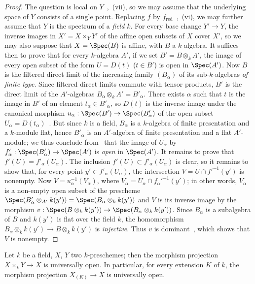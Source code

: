 \begin{proof}
The question is local on $Y$~,~(vii), so we may assume that the underlying space of $Y$ consists of a single point. Replacing $f$ by $f_{\mathrm{red}}$~,~(vi), we may further assume that $Y$ is the spectrum of a \emph{field} $k$. For every base change $Y'\to Y$, the inverse images in $X'=X\times_Y Y'$ of the affine open subsets of $X$ cover $X'$, so we may also suppose that $X=\Spec(B)$ is affine, with $B$ a $k$-algebra.
It suffices then to prove that for every $k$-algebra $A'$, if we set $B'=B\otimes_k A'$, the image of every open subset of the form $U=D(t)$ ($t\in B'$) is open in $\Spec(A')$.
Now $B$ is the filtered direct limit of the increasing family $(B_\alpha)$ of its sub-$k$-algebras \emph{of finite type}. Since filtered direct limits commute with tensor products, $B'$ is the direct limit of the $A'$-algebras $B_\alpha\otimes_k A'=B'_\alpha$.
There exists $\alpha$ such that $t$ is the image in $B'$ of an element $t_\alpha\in B'_\alpha$, so $D(t)$ is the inverse image under the canonical morphism $u_\alpha:\Spec(B')\to\Spec(B'_\alpha)$ of the open subset $U_\alpha=D(t_\alpha)$~.
But since $k$ is a field, $B_\alpha$ is a $k$-algebra of finite presentation and a $k$-module flat, hence $B'_\alpha$ is an $A'$-algebra of finite presentation and a flat $A'$-module; we thus conclude from~ that the image of $U_\alpha$ by $f'_\alpha:\Spec(B'_\alpha)\to\Spec(A')$ is \emph{open} in $\Spec(A')$.
It remains to prove that $f'(U)=f'_\alpha(U_\alpha)$. The inclusion $f'(U)\subset f'_\alpha(U_\alpha)$ is clear, so it remains to show that, for every point $y'\in f'_\alpha(U_\alpha)$, the intersection $V=U\cap f'^{-1}(y')$ is nonempty.
Now $V=u_\alpha^{-1}(V_\alpha)$, where $V_\alpha=U_\alpha\cap f_\alpha'^{-1}(y')$; in other words, $V_\alpha$ is a non-empty open subset of the prescheme $\Spec(B'_\alpha\otimes_{A'}k(y'))=\Spec(B_\alpha\otimes_k k(y'))$ and $V$ is its inverse image by the morphism $v:\Spec(B\otimes_k k(y'))\to\Spec(B_\alpha\otimes_k k(y'))$.
  Since $B_\alpha$ is a subalgebra of $B$ and $k(y')$ is flat over the field
  $k$, the homomorphism
  $B_\alpha\otimes_k k(y')\to B\otimes_k k(y')$ is \emph{injective}.
  Thus $v$ is dominant~, which shows that $V$ is nonempty.
\end{proof}

\begin{corollary}[2.4.10]
\label{IV.2.4.10}
Let $k$ be a field, $X$, $Y$ two $k$-preschemes; then the morphism projection $X\times_k Y\to X$ is universally open.
In particular, for every extension $K$ of $k$, the morphism projection $X_{(K)}\to X$ is universally open.
\end{corollary}

